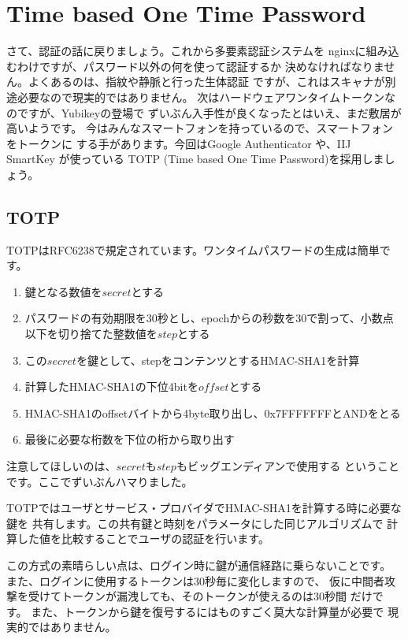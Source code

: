 \chapter*{Time based One Time Password}

さて、認証の話に戻りましょう。これから多要素認証システムを
nginxに組み込むわけですが、パスワード以外の何を使って認証するか
決めなければなりません。よくあるのは、指紋や静脈と行った生体認証
ですが、これはスキャナが別途必要なので現実的ではありません。
次はハードウェアワンタイムトークンなのですが、Yubikeyの登場で
ずいぶん入手性が良くなったとはいえ、まだ敷居が高いようです。
今はみんなスマートフォンを持っているので、スマートフォンをトークンに
する手があります。今回はGoogle Authenticator や、IIJ SmartKey が使っている
TOTP (Time based One Time Password)を採用しましょう。

\section*{TOTP}
TOTPはRFC6238で規定されています。ワンタイムパスワードの生成は簡単です。
\begin{enumerate}
\item 鍵となる数値を$secret$とする
\item パスワードの有効期限を30秒とし、epochからの秒数を30で割って、小数点以下を切り捨てた整数値を$step$とする
\item この$secret$を鍵として、stepをコンテンツとするHMAC-SHA1を計算
\item 計算したHMAC-SHA1の下位4bitを$offset$とする
\item HMAC-SHA1のoffsetバイトから4byte取り出し、0x7FFFFFFFとANDをとる
\item 最後に必要な桁数を下位の桁から取り出す
\end{enumerate}

注意してほしいのは、$secret$も$step$もビッグエンディアンで使用する
ということです。ここでずいぶんハマりました。

TOTPではユーザとサービス・プロバイダでHMAC-SHA1を計算する時に必要な鍵を
共有します。この共有鍵と時刻をパラメータにした同じアルゴリズムで
計算した値を比較することでユーザの認証を行います。

この方式の素晴らしい点は、ログイン時に鍵が通信経路に乗らないことです。
また、ログインに使用するトークンは30秒毎に変化しますので、
仮に中間者攻撃を受けてトークンが漏洩しても、そのトークンが使えるのは30秒間
だけです。
また、トークンから鍵を復号するにはものすごく莫大な計算量が必要で
現実的ではありません。

